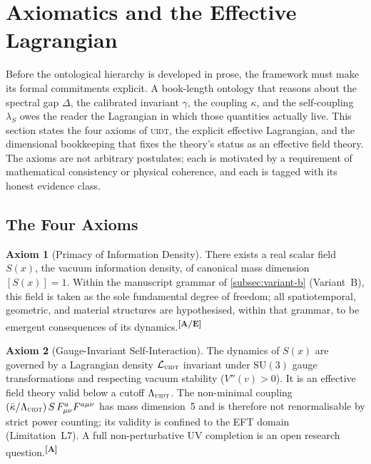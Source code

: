 \documentclass[12pt,a4paper,twoside]{article}
\theoremstyle{plain}
\theoremstyle{definition}
\newtheorem{axiom}{Axiom}
\theoremstyle{remark}
\newcommand{\UIDT}{\textsc{uidt}}
\newcommand{\catmark}[1]{\textsuperscript{\textsf{\textbf{[#1]}}}}
\newcommand{\Sx}{S(x)}
\begin{document}
\section{Axiomatics and the Effective Lagrangian}
\label{sec:axiomatics}

\noindent Before the ontological hierarchy is developed in prose, the framework must make its formal commitments explicit. A book-length ontology that reasons about the spectral gap $\Delta$, the calibrated invariant $\gamma$, the coupling $\kappa$, and the self-coupling $\lambda_S$ owes the reader the Lagrangian in which those quantities actually live. This section states the four axioms of \UIDT, the explicit effective Lagrangian, and the dimensional bookkeeping that fixes the theory's status as an effective field theory. The axioms are not arbitrary postulates; each is motivated by a requirement of mathematical consistency or physical coherence, and each is tagged with its honest evidence class.

\subsection{The Four Axioms}
\label{subsec:four-axioms}

\begin{axiom}[Primacy of Information Density]
\label{ax:primacy}
There exists a real scalar field $\Sx$, the vacuum information density, of canonical mass dimension $[\Sx]=1$. Within the manuscript grammar of \cref{subsec:variant-b} (Variant~B), this field is taken as the sole fundamental degree of freedom; all spatiotemporal, geometric, and material structures are hypothesised, within that grammar, to be emergent consequences of its dynamics.\catmark{A/E}
\end{axiom}

\begin{axiom}[Gauge-Invariant Self-Interaction]
\label{ax:gauge}
The dynamics of $\Sx$ are governed by a Lagrangian density $\mathcal{L}_{\UIDT}$ invariant under $\mathrm{SU}(3)$ gauge transformations and respecting vacuum stability ($V''(v)>0$). It is an effective field theory valid below a cutoff $\Lambda_{\UIDT}$. The non-minimal coupling $(\bar\kappa/\Lambda_{\UIDT})\,S\,F_{\mu\nu}^a F^{a\mu\nu}$ has mass dimension~5 and is therefore not renormalisable by strict power counting; its validity is confined to the EFT domain (Limitation~L7). A full non-perturbative UV completion is an open research question.\catmark{A}
\end{axiom}
\end{document}
